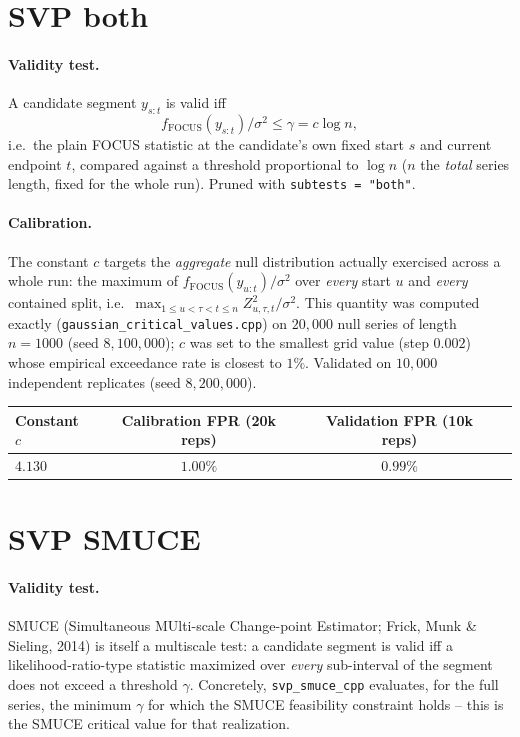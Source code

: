\documentclass[11pt]{article}
\newcommand{\gam}{\gamma}
\begin{document}
\section{SVP both}

\paragraph{Validity test.} A candidate segment $y_{s:t}$ is valid iff
\[
f_{\mathrm{FOCUS}}(y_{s:t})/\sigma^2 \le \gam = c\log n,
\]
i.e.\ the plain FOCUS statistic at the candidate's own fixed start $s$ and
current endpoint $t$, compared against a threshold proportional to
$\log n$ ($n$ the \emph{total} series length, fixed for the whole run).
Pruned with \texttt{subtests = "both"}.

\paragraph{Calibration.} The constant $c$ targets the \emph{aggregate}
null distribution actually exercised across a whole run: the maximum of
$f_{\mathrm{FOCUS}}(y_{u:t})/\sigma^2$ over \emph{every} start $u$ and
\emph{every} contained split, i.e.\ $\max_{1\le u<\tau<t\le n}
Z_{u,\tau,t}^2/\sigma^2$. This quantity was computed exactly
(\texttt{gaussian\_critical\_values.cpp}) on $20{,}000$ null series of
length $n=1000$ (seed $8{,}100{,}000$); $c$ was set to the smallest grid
value (step $0.002$) whose empirical exceedance rate is closest to $1\%$.
Validated on $10{,}000$ independent replicates (seed $8{,}200{,}000$).

\begin{center}
\begin{tabular}{lccc}
\toprule
Constant $c$ & Calibration FPR (20k reps) & Validation FPR (10k reps) \\
\midrule
$4.130$ & $1.00\%$ & $0.99\%$ \\
\bottomrule
\end{tabular}
\end{center}

\section{SVP SMUCE}

\paragraph{Validity test.} SMUCE (Simultaneous MUlti-scale
Change-point Estimator; Frick, Munk \& Sieling, 2014) is itself a
multiscale test: a candidate segment is valid iff a likelihood-ratio-type
statistic maximized over \emph{every} sub-interval of the segment does not
exceed a threshold $\gam$. Concretely, \texttt{svp\_smuce\_cpp} evaluates,
for the full series, the minimum $\gam$ for which the SMUCE feasibility
constraint holds -- this is the SMUCE critical value for that realization.
\end{document}
